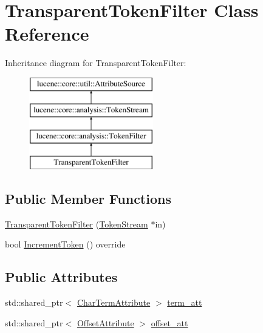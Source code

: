 \hypertarget{classTransparentTokenFilter}{}\section{Transparent\+Token\+Filter Class Reference}
\label{classTransparentTokenFilter}
Inheritance diagram for Transparent\+Token\+Filter\+:\begin{figure}[H]
\begin{center}
\leavevmode
\includegraphics[height=4.000000cm]{classTransparentTokenFilter}
\end{center}
\end{figure}
\subsection*{Public Member Functions}
\begin{DoxyCompactItemize}
\item 
\mbox{\hyperlink{classTransparentTokenFilter_a126d82cb5ab2fe0d27f2e19900d469c6}{Transparent\+Token\+Filter}} (\mbox{\hyperlink{classlucene_1_1core_1_1analysis_1_1TokenStream}{Token\+Stream}} $\ast$in)
\item 
bool \mbox{\hyperlink{classTransparentTokenFilter_ae0bc79516b4f3fae3af29a9d05b4acf6}{Increment\+Token}} () override
\end{DoxyCompactItemize}
\subsection*{Public Attributes}
\begin{DoxyCompactItemize}
\item 
std\+::shared\+\_\+ptr$<$ \mbox{\hyperlink{classlucene_1_1core_1_1analysis_1_1tokenattributes_1_1CharTermAttribute}{Char\+Term\+Attribute}} $>$ \mbox{\hyperlink{classTransparentTokenFilter_abbfe63255f2b10eeb803f10cd9f9b8a3}{term\+\_\+att}}
\item 
std\+::shared\+\_\+ptr$<$ \mbox{\hyperlink{classlucene_1_1core_1_1analysis_1_1tokenattributes_1_1OffsetAttribute}{Offset\+Attribute}} $>$ \mbox{\hyperlink{classTransparentTokenFilter_a068937d3502af2266f0bad7c7943252a}{offset\+\_\+att}}
\end{DoxyCompactItemize}
